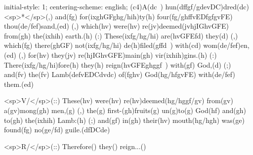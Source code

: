 initial-style: 1;
centering-scheme: english;
(c4)A(dc~) hun(dffgf/gdevDC)dred(dc) <sp>*</sp>(,) and(fg) for(ixghGFghg/hih)ty(h) four(fg/ghffvEDfgfgvFE) thou(de/fef)sand,(ed) (,) which(hv) were(hv) re(jv)deemed(jvhjIGhvGFE) from(gh) the(ixhih) earth.(h) (:) These(ixfg/hg/hi) are(hvGFEfd) they(d) (,) which(fg) there(ghGF) not(ixfg/hg/hi) de(h)filed(gffd~) with(cd) wom(de/fef)en,(ed) (,) for(hv) they(jv) re(hjIGhvGFE)main(gh) vir(ixhih)gins.(h) (:) There(ixfg/hg/hi)fore(h) they(h) reign(hvGFEghggf~) with(gf) God,(d) (;) and(fv) the(fv) Lamb(defvEDCdvdc) of(fghv) God(hg/hfgvFE) with(de/fef) them.(ed)

<sp>V/</sp>(::) These(hv) were(hv) re(hv)deemed(hg/hggf/gv) from(gv) a(gv)mong(gh) men,(g) (,) the(g) first-(gh)fruits(g) un(g)to(g) God(hf) and(gh) to(gh) the(ixhih) Lamb:(h) (;) and(gf) in(gh) their(hv) mouth(hg/hgh) was(ge) found(fg) no(ge/fd) guile.(dfDCde)

<sp>R/</sp>(::) Therefore() they() reign...()